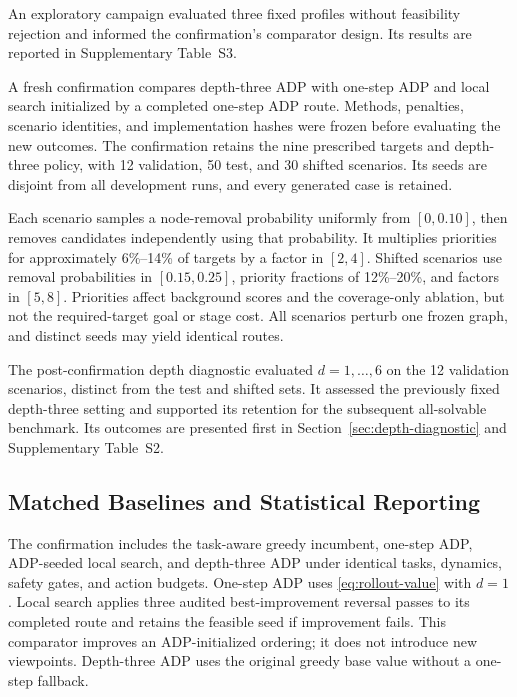 \documentclass{IEEEtaes}
\newcommand{\RTTestN}{50}
\newcommand{\RTOodN}{30}
\newcommand{\RTValidationN}{12}
\begin{document}
An exploratory campaign evaluated three fixed profiles without feasibility rejection and informed the confirmation's comparator design. Its results are reported in Supplementary Table~S3.

A fresh confirmation compares depth-three ADP with one-step ADP and local search initialized by a completed one-step ADP route. Methods, penalties, scenario identities, and implementation hashes were frozen before evaluating the new outcomes. The confirmation retains the nine prescribed targets and depth-three policy, with \RTValidationN{} validation, \RTTestN{} test, and \RTOodN{} shifted scenarios. Its seeds are disjoint from all development runs, and every generated case is retained.

Each scenario samples a node-removal probability uniformly from $[0,0.10]$, then removes candidates independently using that probability. It multiplies priorities for approximately 6\%--14\% of targets by a factor in $[2,4]$. Shifted scenarios use removal probabilities in $[0.15,0.25]$, priority fractions of 12\%--20\%, and factors in $[5,8]$. Priorities affect background scores and the coverage-only ablation, but not the required-target goal or stage cost. All scenarios perturb one frozen graph, and distinct seeds may yield identical routes.

The post-confirmation depth diagnostic evaluated $d=1,\ldots,6$ on the 12 validation scenarios, distinct from the test and shifted sets. It assessed the previously fixed depth-three setting and supported its retention for the subsequent all-solvable benchmark. Its outcomes are presented first in Section~\ref{sec:depth-diagnostic} and Supplementary Table~S2.

\subsection{Matched Baselines and Statistical Reporting}

The confirmation includes the task-aware greedy incumbent, one-step ADP, ADP-seeded local search, and depth-three ADP under identical tasks, dynamics, safety gates, and action budgets. One-step ADP uses \eqref{eq:rollout-value} with $d=1$. Local search applies three audited best-improvement reversal passes to its completed route and retains the feasible seed if improvement fails. This comparator improves an ADP-initialized ordering; it does not introduce new viewpoints. Depth-three ADP uses the original greedy base value without a one-step fallback.
\end{document}
